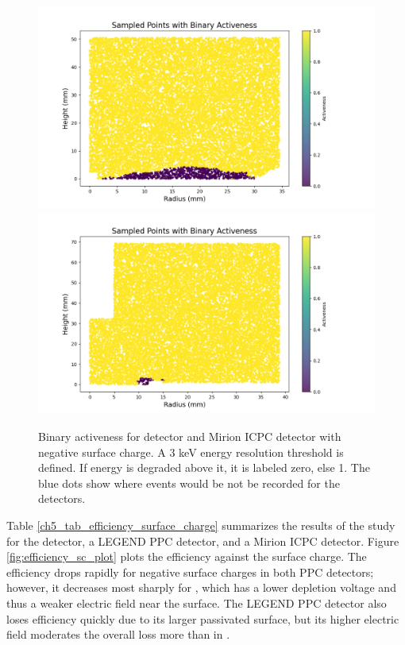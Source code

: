 

\begin{figure}%
\centering
\includegraphics[trim={1.5cm 0cm 6cm 1.77cm},clip,width=0.49\linewidth]{ch5/figs/bianry_act_ponama_1_-0.03.png}
\includegraphics[trim={1.5cm 0cm 6cm 1.77cm},clip,width=0.49\linewidth]{ch5/figs/bianry_act_V07647A_-0.03.png}
\caption{Binary activeness for {\ponama} detector and Mirion ICPC detector with negative surface charge. A $3$ keV energy resolution threshold is defined. If energy is degraded above it, it is labeled zero, else 1. The blue dots show where {\onbb} events would be not be recorded for the detectors.}
\label{ch5_fig_binary_activenss}
\end{figure}

Table \ref{ch5_tab_efficiency_surface_charge} summarizes the results of the study for the {\ponama} detector, a LEGEND PPC detector, and a Mirion ICPC detector. Figure \ref{fig:efficiency_sc_plot} plots the efficiency against the surface charge. The efficiency drops rapidly for negative surface charges in both PPC detectors; however, it decreases most sharply for {\ponama}, which has a lower depletion voltage and thus a weaker electric field near the surface. The LEGEND PPC detector also loses efficiency quickly due to its larger passivated surface, but its higher electric field moderates the overall loss more than in {\ponama}.

